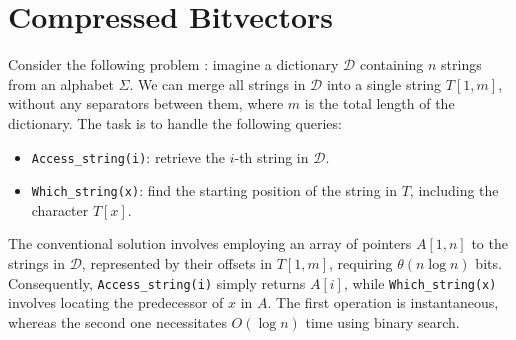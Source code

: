 \section{Compressed Bitvectors}
Consider the following problem \cite{ferragina2023pearls}: imagine a dictionary $\mathcal{D}$ containing $n$ strings from an alphabet $\Sigma$. We can merge all strings in $\mathcal{D}$ into a single string $T[1,m]$, without any separators between them, where $m$ is the total length of the dictionary. The task is to handle the following queries:
    \begin{itemize}
    \item \texttt{Access\_string(i)}: retrieve the $i$-th string in $\mathcal{D}$.
    \item \texttt{Which\_string(x)}: find the starting position of the string in $T$, including the character $T[x]$.
\end{itemize}
The conventional solution involves employing an array of pointers $A[1, n]$ to the strings in $\mathcal{D}$, represented by their offsets in $T[1, m]$, requiring $\theta(n \log n)$ bits. Consequently, \texttt{Access\_string(i)} simply returns $A[i]$, while \texttt{Which\_string(x)} involves locating the predecessor of $x$ in $A$. The first operation is instantaneous, whereas the second one necessitates $O(\log n)$ time using binary search. \vspace{0.4cm}

